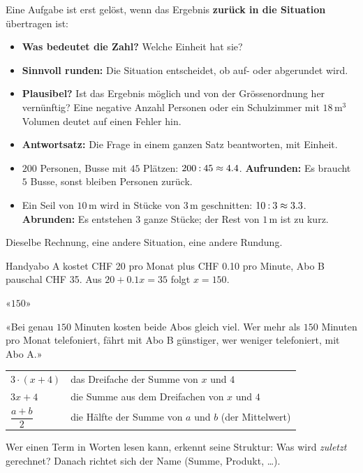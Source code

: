 \documentclass[11pt]{exam}
\begin{document}
\begin{merke}
Eine Aufgabe ist erst gelöst, wenn das Ergebnis \textbf{zurück in die
Situation} übertragen ist:
\begin{itemize}
  \item \textbf{Was bedeutet die Zahl?} Welche Einheit hat sie?
  \item \textbf{Sinnvoll runden:} Die Situation entscheidet, ob auf- oder
        abgerundet wird.
  \item \textbf{Plausibel?} Ist das Ergebnis möglich und von der
        Grössenordnung her vernünftig? Eine negative Anzahl Personen oder ein
        Schulzimmer mit $18$\,m$^3$ Volumen deutet auf einen Fehler hin.
  \item \textbf{Antwortsatz:} Die Frage in einem ganzen Satz beantworten,
        mit Einheit.
\end{itemize}
\end{merke}

\begin{beispiel}
\begin{itemize}
  \item $200$ Personen, Busse mit $45$ Plätzen: $200 \mathbin{:} 45 \approx 4.4$.
        \textbf{Aufrunden:} Es braucht $5$ Busse, sonst bleiben Personen
        zurück.
  \item Ein Seil von $10$\,m wird in Stücke von $3$\,m geschnitten:
        $10 \mathbin{:} 3 \approx 3.3$. \textbf{Abrunden:} Es entstehen $3$ ganze
        Stücke; der Rest von $1$\,m ist zu kurz.
\end{itemize}
Dieselbe Rechnung, eine andere Situation, eine andere Rundung.
\end{beispiel}

\begin{beispiel}
Handyabo A kostet CHF 20 pro Monat plus CHF 0.10 pro Minute, Abo B pauschal
CHF 35. Aus $20 + 0.1x = 35$ folgt $x = 150$.

\falsch\quad «$150$»

\richtig\quad «Bei genau $150$ Minuten kosten beide Abos gleich viel. Wer mehr
als $150$ Minuten pro Monat telefoniert, fährt mit Abo B günstiger, wer
weniger telefoniert, mit Abo A.»
\end{beispiel}

\begin{beispiel}
\begin{center}
\renewcommand{\arraystretch}{1.4}
\begin{tabular}{ll}
  $3 \cdot (x + 4)$ & das Dreifache der Summe von $x$ und $4$ \\
  $3x + 4$          & die Summe aus dem Dreifachen von $x$ und $4$ \\
  $\dfrac{a + b}{2}$ & die Hälfte der Summe von $a$ und $b$ (der Mittelwert)
\end{tabular}
\end{center}
Wer einen Term in Worten lesen kann, erkennt seine Struktur: Was wird
\emph{zuletzt} gerechnet? Danach richtet sich der Name (Summe, Produkt, \ldots).
\end{beispiel}
\end{document}
